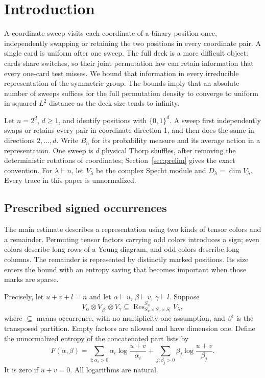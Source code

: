 \section{Introduction}
\label{sec:introduction}
A coordinate sweep visits each coordinate of a binary position once,
independently swapping or retaining the two positions in every coordinate
pair. A single card is uniform after one sweep. The full deck is a more
difficult object: cards share switches, so their joint permutation law can
retain information that every one-card test misses. We bound that
information in every irreducible representation of the symmetric group.
The bounds imply that an absolute number of sweeps suffices for the full
permutation density to converge to uniform in squared $L^2$ distance as
the deck size tends to infinity.

Let $n=2^d$, $d\ge1$, and identify positions with $\{0,1\}^d$.
A sweep first independently swaps or retains every pair in coordinate
direction 1, and then does the same in directions $2,\ldots,d$.
Write $B_n$ for its probability measure and its average action in a
representation. One sweep is $d$ physical Thorp shuffles, after removing
the deterministic rotations of coordinates; Section~\ref{sec:prelim}
gives the exact convention. For $\lambda\vdash n$, let $V_\lambda$ be
the complex Specht module and $D_\lambda=\dim V_\lambda$. Every trace
in this paper is unnormalized.

\subsection*{Prescribed signed occurrences}
The main estimate describes a representation using two kinds of tensor
colors and a remainder. Permuting tensor factors carrying odd colors
introduces a sign; even
colors describe long rows of a Young diagram, and odd colors describe
long columns. The remainder is represented by distinctly marked positions.
Its size enters the bound with an entropy saving that becomes important
when those marks are sparse.

Precisely, let $u+v+l=n$ and let $\alpha\vdash u$, $\beta\vdash v$,
$\gamma\vdash l$. Suppose
\begin{equation}\label{ten:spin:eq:1}
 V_\alpha\otimes V_{\beta^{\mathrm t}}\otimes V_\gamma
 \subseteq\operatorname{Res}^{S_n}_{S_u\times S_v\times S_l}V_\lambda,
\end{equation}
where $\subseteq$ means occurrence, with no multiplicity-one assumption,
and $\beta^{\mathrm t}$ is the transposed partition. Empty factors are
allowed and have dimension one. Define the unnormalized entropy of the
concatenated part lists by
\begin{equation}\label{ten:spin:eq:2}
 F(\alpha,\beta)=\sum_{i:\alpha_i>0}\alpha_i\log\frac{u+v}{\alpha_i}
 +\sum_{j:\beta_j>0}\beta_j\log\frac{u+v}{\beta_j}.
\end{equation}
It is zero if $u+v=0$. All logarithms are natural.


